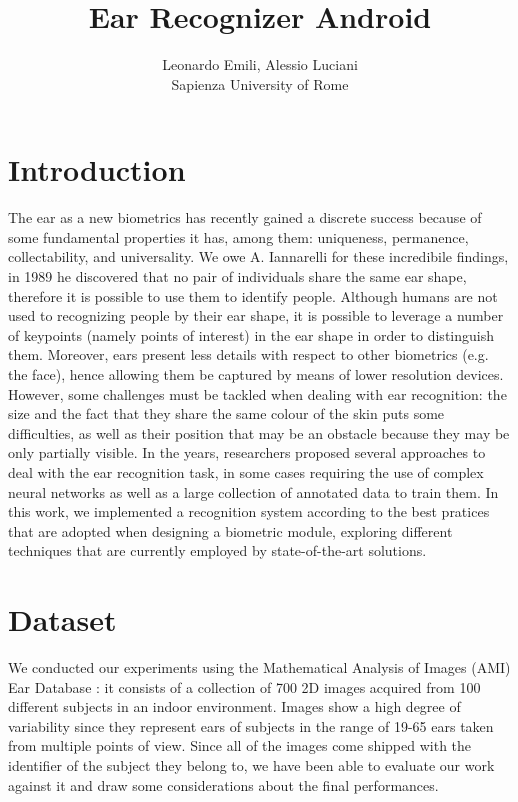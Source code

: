 \documentclass{article}
\begin{document}
\title{Ear Recognizer Android}
\author{Leonardo Emili, Alessio Luciani\\
Sapienza University of Rome}
\renewcommand{\today}{February, 2021}
\maketitle

\section{Introduction}

The ear as a new biometrics has recently gained a discrete success because of some fundamental properties it has,
among them: uniqueness, permanence, collectability, and universality.
We owe A. Iannarelli for these incredibile findings, in 1989 he discovered that no pair of individuals
share the same ear shape, therefore it is possible to use them to identify people. Although humans are
not used to recognizing people by their ear shape, it is possible to leverage a number of keypoints
(namely points of interest) in the ear shape in order to distinguish them. Moreover, ears present
less details with respect to other biometrics (e.g. the face), hence allowing them be captured by
means of lower resolution devices. However, some challenges must be tackled when dealing with ear
recognition: the size and the fact that they share the same colour of the skin puts some difficulties,
as well as their position that may be an obstacle because they may be only partially visible.
In the years, researchers proposed several approaches to deal with the ear recognition task, in some
cases requiring the use of complex neural networks as well as a large collection of annotated data
to train them. In this work, we implemented a recognition system according to the best pratices that
are adopted when designing a biometric module, exploring different techniques that are currently employed
by state-of-the-art solutions.

\section{Dataset}

We conducted our experiments using the Mathematical Analysis of Images (AMI) Ear Database \cite{ami}: it consists
of a collection of 700 2D images acquired from 100 different subjects in an indoor environment.
Images show a high degree of variability since they represent ears of subjects in the range of 19-65 ears
taken from multiple points of view. Since all of the images come shipped with the identifier of the subject
they belong to, we have been able to evaluate our work against it and draw some considerations
about the final performances.
\end{document}
